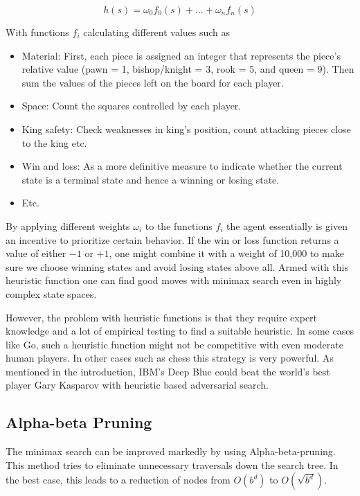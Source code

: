 \begin{equation}
    h(s) = \omega_0f_0(s) + ... + \omega_nf_n(s)
\end{equation}

With functions $ f_i $ calculating different values such as

\begin{itemize}
    \item Material: First, each piece is assigned an integer that represents the piece's relative value (pawn = 1, bishop/knight = 3, rook = 5, and queen = 9). Then sum the values of the pieces left on the board for each player.
    \item Space: Count the squares controlled by each player.
    \item King safety: Check weaknesses in king's position, count attacking pieces close to the king etc.
    \item Win and loss: As a more definitive measure to indicate whether the current state is a terminal state and hence a winning or losing state.
    \item Etc.
\end{itemize}

By applying different weights $ \omega_i $ to the functions $ f_i $ the agent essentially is given an incentive to prioritize certain behavior. If the win or loss function returns a value of either $-1$ or $+1$, one might combine it with a weight of 10,000 to make sure we choose winning states and avoid losing states above all. Armed with this heuristic function one can find good moves with minimax search even in highly complex state spaces.

However, the problem with heuristic functions is that they require expert knowledge and a lot of empirical testing to find a suitable heuristic. In some cases like Go, such a heuristic function might not be competitive with even moderate human players. In other cases such as chess this strategy is very powerful. As mentioned in the introduction, IBM's Deep Blue could beat the world's best player Gary Kasparov with heuristic based adversarial search.

\subsection{Alpha-beta Pruning}
The minimax search can be improved markedly by using Alpha-beta-pruning. This method tries to eliminate unnecessary traversals down the search tree. In the best case, this leads to a reduction of nodes from $ O(b^d) $ to $ O(\sqrt{b^d}) $.

